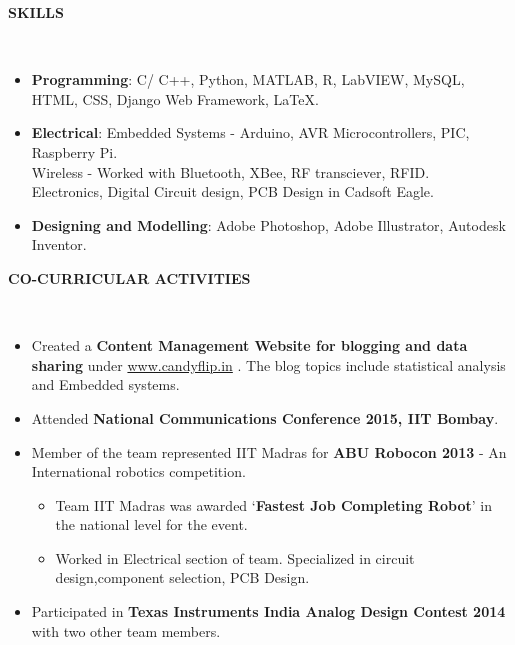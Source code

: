 \documentclass[a4paper,10pt]{article}
\newcommand{\lsep}{-0.5cm}
\newcommand{\resheading}[1]{{\small \colorbox{mygrey}{\begin{minipage}{0.975\textwidth}{\textbf{#1 \vphantom{p\^{E}}}}\end{minipage}}}}
\begin{document}
\resheading{\textbf{SKILLS} }\\[\lsep]
    \begin{itemize}
        \item \textbf{Programming}: C/ C++, Python, MATLAB, R, LabVIEW, MySQL, HTML, CSS, Django Web Framework, \LaTeX.
        \vspace{-5pt}
        \item \textbf{Electrical}: Embedded Systems - Arduino,  AVR Microcontrollers, PIC,  Raspberry Pi.\\
        Wireless - Worked with Bluetooth, XBee, RF transciever, RFID.\\
        Electronics, Digital Circuit design, PCB Design in Cadsoft Eagle.
        \vspace{-5pt}
        \item \textbf{Designing and Modelling}: Adobe Photoshop, Adobe Illustrator, Autodesk Inventor.
    \end{itemize}


\resheading{\textbf{CO-CURRICULAR ACTIVITIES} }\\[\lsep]
    \begin{itemize}
        \item Created a \textbf{Content Management Website for blogging and data sharing} under \hspace{3pt}\url{www.candyflip.in} . The blog topics include statistical analysis and Embedded systems.\vspace{-5pt}
        \item Attended \textbf{National Communications Conference 2015, IIT Bombay}.\vspace{-5pt}
        \item Member of the team represented IIT Madras for \textbf{ABU Robocon 2013} - An International robotics competition.
        \begin{itemize}
            \vspace{-5pt}
            \item Team IIT Madras was awarded `\textbf{Fastest Job Completing Robot}' in the national level for the event.
            \item  Worked in Electrical section of team. Specialized in circuit design,component selection, PCB Design.
        \end{itemize}
        \vspace{-5pt}
        \item Participated in \textbf{Texas Instruments India Analog Design Contest 2014} with two other team members.
    \end{itemize} 
\end{document}
